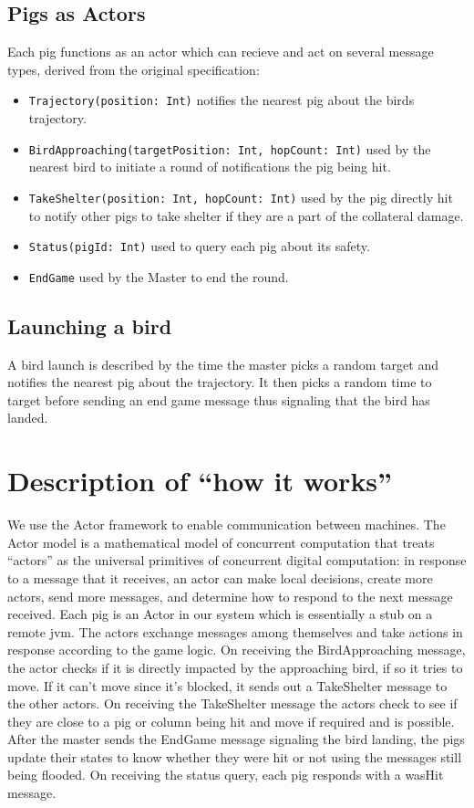 \documentclass[]{article}
\begin{document}
\subsection{Pigs as Actors}

Each pig functions as an actor which can recieve and act on several
message types, derived from the original specification:

\begin{itemize}
\item
  \texttt{Trajectory(position: Int)} notifies the nearest pig about the
  birds trajectory.
\item
  \texttt{BirdApproaching(targetPosition: Int, hopCount: Int)} used by
  the nearest bird to initiate a round of notifications the pig being
  hit.
\item
  \texttt{TakeShelter(position: Int, hopCount: Int)} used by the pig
  directly hit to notify other pigs to take shelter if they are a part
  of the collateral damage.
\item
  \texttt{Status(pigId: Int)} used to query each pig about its safety.
\item
  \texttt{EndGame} used by the Master to end the round.
\end{itemize}

\subsection{Launching a bird}

A bird launch is described by the time the master picks a random target
and notifies the nearest pig about the trajectory. It then picks a
random time to target before sending an end game message thus signaling
that the bird has landed.

\section{Description of ``how it works''}

We use the Actor framework to enable communication between machines. The
Actor model is a mathematical model of concurrent computation that
treats ``actors'' as the universal primitives of concurrent digital
computation: in response to a message that it receives, an actor can
make local decisions, create more actors, send more messages, and
determine how to respond to the next message received. Each pig is an
Actor in our system which is essentially a stub on a remote jvm. The
actors exchange messages among themselves and take actions in response
according to the game logic. On receiving the BirdApproaching message,
the actor checks if it is directly impacted by the approaching bird, if
so it tries to move. If it can't move since it's blocked, it sends out a
TakeShelter message to the other actors. On receiving the TakeShelter
message the actors check to see if they are close to a pig or column
being hit and move if required and is possible. After the master sends
the EndGame message signaling the bird landing, the pigs update their
states to know whether they were hit or not using the messages still
being flooded. On receiving the status query, each pig responds with a
wasHit message.
\end{document}
